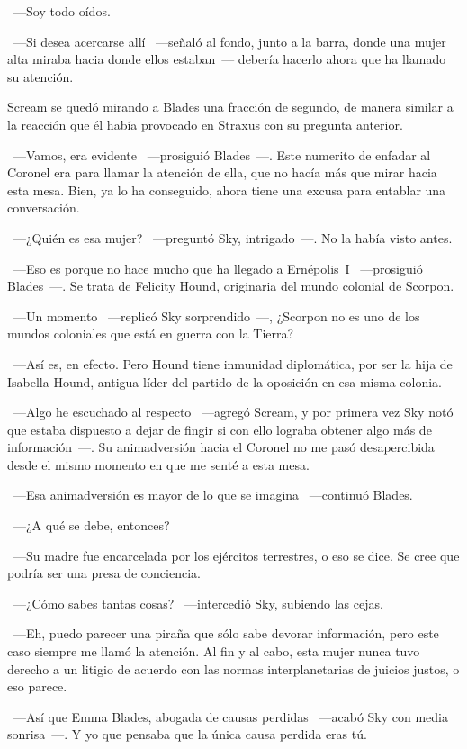 ~---Soy todo oídos.

~---Si desea acercarse allí ~---señaló al fondo, junto a la barra, donde una mujer alta miraba hacia donde ellos estaban~--- debería hacerlo ahora que ha llamado su atención.

Scream se quedó mirando a Blades una fracción de segundo, de manera similar a la reacción que él había provocado en Straxus con su pregunta anterior.

~---Vamos, era evidente ~---prosiguió Blades~---. Este numerito de enfadar al Coronel era para llamar la atención de ella, que no hacía más que mirar hacia esta mesa. Bien, ya lo ha conseguido, ahora tiene una excusa para entablar una conversación.

~---¿Quién es esa mujer? ~---preguntó Sky, intrigado~---. No la había visto antes.

~---Eso es porque no hace mucho que ha llegado a Ernépolis~I ~---prosiguió Blades~---. Se trata de Felicity Hound, originaria del mundo colonial de Scorpon.

~---Un momento ~---replicó Sky sorprendido~---, ¿Scorpon no es uno de los mundos coloniales que está en guerra con la Tierra?

~---Así es, en efecto. Pero Hound tiene inmunidad diplomática, por ser la hija de Isabella Hound, antigua líder del partido de la oposición en esa misma colonia.

~---Algo he escuchado al respecto ~---agregó Scream, y por primera vez Sky notó que estaba dispuesto a dejar de fingir si con ello lograba obtener algo más de información~---. Su animadversión hacia el Coronel no me pasó desapercibida desde el mismo momento en que me senté a esta mesa.

~---Esa animadversión es mayor de lo que se imagina ~---continuó Blades.

~---¿A qué se debe, entonces?

~---Su madre fue encarcelada por los ejércitos terrestres, o eso se dice. Se cree que podría ser una presa de conciencia.

~---¿Cómo sabes tantas cosas? ~---intercedió Sky, subiendo las cejas.

~---Eh, puedo parecer una piraña que sólo sabe devorar información, pero este caso siempre me llamó la atención. Al fin y al cabo, esta mujer nunca tuvo derecho a un litigio de acuerdo con las normas interplanetarias de juicios justos, o eso parece.

~---Así que Emma Blades, abogada de causas perdidas ~---acabó Sky con media sonrisa~---. Y yo que pensaba que la única causa perdida eras tú.

